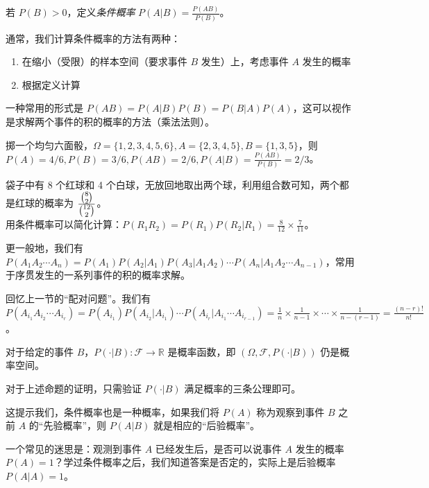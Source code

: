\documentclass[../main.tex]{subfiles}
\begin{document}
\begin{definition}\label{def:1.6.1}
若 $P(B)>0$，定义\emph{条件概率} $P(A|B)=\frac{P(AB)}{P(B)}$。
\end{definition}

通常，我们计算条件概率的方法有两种：
\begin{enumerate}
    \item 在缩小（受限）的样本空间（要求事件 $B$ 发生）上，考虑事件 $A$ 发生的概率
    \item 根据定义计算
\end{enumerate}

一种常用的形式是 $P(AB)=P(A|B)P(B)=P(B|A)P(A)$，这可以视作是求解两个事件的积的概率的方法（乘法法则）。

\begin{example}
掷一个均匀六面骰，$\Omega=\{1,2,3,4,5,6\},A=\{2,3,4,5\},B=\{1,3,5\}$，则 $P(A)=4/6,P(B)=3/6,P(AB)=2/6,P(A|B)=\frac{P(AB)}{P(B)}=2/3$。
\end{example}

\begin{example}
袋子中有 8 个红球和 4 个白球，无放回地取出两个球，利用组合数可知，两个都是红球的概率为 $\frac{\tbinom{8}{2}}{\tbinom{12}{2}}$。\\
用条件概率可以简化计算：$P(R_1R_2)=P(R_1)P(R_2|R_1)=\frac{8}{12}\times\frac{7}{11}$。
\end{example}

更一般地，我们有 $P(A_1A_2\cdots A_n)=P(A_1)P(A_2|A_1)P(A_3|A_1A_2)\cdots P(A_n|A_1A_2\cdots A_{n-1})$，常用于序贯发生的一系列事件的积的概率求解。

\begin{example}
回忆上一节的“配对问题”。我们有 $P(A_{i_1}A_{i_2}\cdots A_{i_r})=P(A_{i_1})P(A_{i_2}|A_{i_1})\cdots P(A_{i_r}|A_{i_1}\cdots A_{i_{r-1}})=\frac{1}{n}\times\frac{1}{n-1}\times\cdots\times\frac{1}{n-(r-1)}=\frac{(n-r)!}{n!}$。
\end{example}

\begin{proposition}
对于给定的事件 $B$，$P(\cdot|B):\mathcal{F}\rightarrow\mathbb{R}$ 是概率函数，即 $(\Omega,\mathcal{F},P(\cdot|B))$ 仍是概率空间。
\end{proposition}

对于上述命题的证明，只需验证 $P(\cdot|B)$ 满足概率的三条公理即可。

这提示我们，条件概率也是一种概率，如果我们将 $P(A)$ 称为观察到事件 $B$ 之前 $A$ 的“先验概率”，则 $P(A|B)$ 就是相应的“后验概率”。

一个常见的迷思是：观测到事件 $A$ 已经发生后，是否可以说事件 $A$ 发生的概率 $P(A)=1$？学过条件概率之后，我们知道答案是否定的，实际上是后验概率 $P(A|A)=1$。
\end{document}
